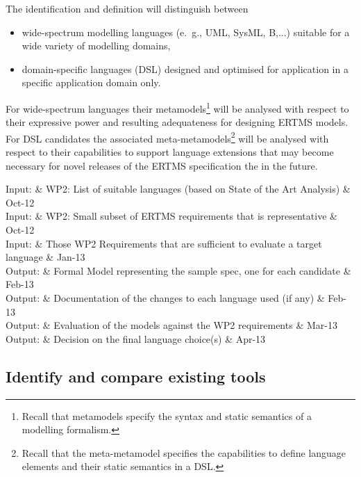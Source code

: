 \documentclass{template/openetcs_article}
\begin{document}
The identification and definition will distinguish between
\begin{itemize}
\item wide-spectrum modelling languages (e.~g., UML, SysML, B,...) suitable for a wide variety of modelling domains,
\item domain-specific languages (DSL) designed and optimised 
for application in a specific application domain 
only.
\end{itemize}
For wide-spectrum languages their metamodels\footnote{Recall that metamodels specify the syntax
and static semantics of a modelling formalism.} will be analysed with respect to their expressive power
and resulting adequateness for designing ERTMS models.
For DSL candidates the associated meta-metamodels\footnote{Recall that the meta-metamodel 
specifies the capabilities to define language elements and their static semantics in a DSL.} 
will be analysed with respect to their
capabilities to support language extensions that may become necessary for novel releases of the ERTMS 
specification the in the future. 

\begin{inoutput}
Input: & WP2: List of suitable languages (based on State of the Art Analysis) & Oct-12 \\
Input: & WP2: Small subset of ERTMS requirements that is representative & Oct-12 \\
Input: & Those WP2 Requirements that are sufficient to evaluate a target language & Jan-13 \\
\hline
Output: & Formal Model representing the sample spec, one for each candidate & Feb-13 \\
Output: & Documentation of the changes to each language used (if any) & Feb-13 \\
Output: & Evaluation of the models against the WP2 requirements & Mar-13 \\
Output: & Decision on the final language choice(s) & Apr-13 \\
\end{inoutput}

\subsection{Identify and compare existing tools}
\label{sec:tool}
\end{document}
